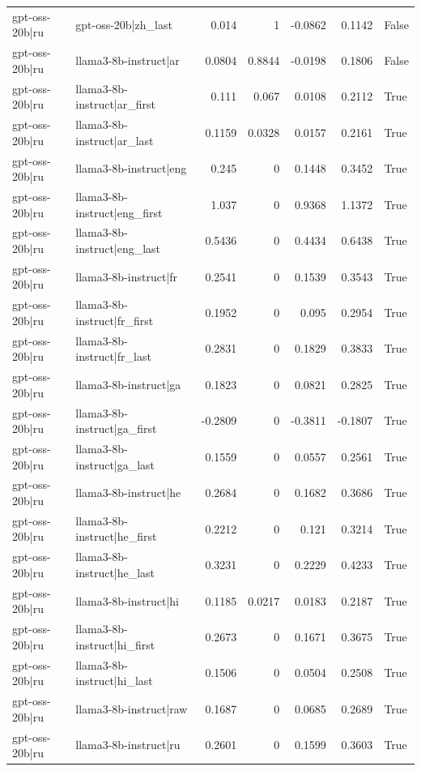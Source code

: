 \begin{table}
\begin{tabular}{l l r r r r l}
gpt-oss-20b|ru & gpt-oss-20b|zh_last & 0.014 & 1 & -0.0862 & 0.1142 & False \\
gpt-oss-20b|ru & llama3-8b-instruct|ar & 0.0804 & 0.8844 & -0.0198 & 0.1806 & False \\
gpt-oss-20b|ru & llama3-8b-instruct|ar_first & 0.111 & 0.067 & 0.0108 & 0.2112 & True \\
gpt-oss-20b|ru & llama3-8b-instruct|ar_last & 0.1159 & 0.0328 & 0.0157 & 0.2161 & True \\
gpt-oss-20b|ru & llama3-8b-instruct|eng & 0.245 & 0 & 0.1448 & 0.3452 & True \\
gpt-oss-20b|ru & llama3-8b-instruct|eng_first & 1.037 & 0 & 0.9368 & 1.1372 & True \\
gpt-oss-20b|ru & llama3-8b-instruct|eng_last & 0.5436 & 0 & 0.4434 & 0.6438 & True \\
gpt-oss-20b|ru & llama3-8b-instruct|fr & 0.2541 & 0 & 0.1539 & 0.3543 & True \\
gpt-oss-20b|ru & llama3-8b-instruct|fr_first & 0.1952 & 0 & 0.095 & 0.2954 & True \\
gpt-oss-20b|ru & llama3-8b-instruct|fr_last & 0.2831 & 0 & 0.1829 & 0.3833 & True \\
gpt-oss-20b|ru & llama3-8b-instruct|ga & 0.1823 & 0 & 0.0821 & 0.2825 & True \\
gpt-oss-20b|ru & llama3-8b-instruct|ga_first & -0.2809 & 0 & -0.3811 & -0.1807 & True \\
gpt-oss-20b|ru & llama3-8b-instruct|ga_last & 0.1559 & 0 & 0.0557 & 0.2561 & True \\
gpt-oss-20b|ru & llama3-8b-instruct|he & 0.2684 & 0 & 0.1682 & 0.3686 & True \\
gpt-oss-20b|ru & llama3-8b-instruct|he_first & 0.2212 & 0 & 0.121 & 0.3214 & True \\
gpt-oss-20b|ru & llama3-8b-instruct|he_last & 0.3231 & 0 & 0.2229 & 0.4233 & True \\
gpt-oss-20b|ru & llama3-8b-instruct|hi & 0.1185 & 0.0217 & 0.0183 & 0.2187 & True \\
gpt-oss-20b|ru & llama3-8b-instruct|hi_first & 0.2673 & 0 & 0.1671 & 0.3675 & True \\
gpt-oss-20b|ru & llama3-8b-instruct|hi_last & 0.1506 & 0 & 0.0504 & 0.2508 & True \\
gpt-oss-20b|ru & llama3-8b-instruct|raw & 0.1687 & 0 & 0.0685 & 0.2689 & True \\
gpt-oss-20b|ru & llama3-8b-instruct|ru & 0.2601 & 0 & 0.1599 & 0.3603 & True \\

\end{tabular}
\end{table}
